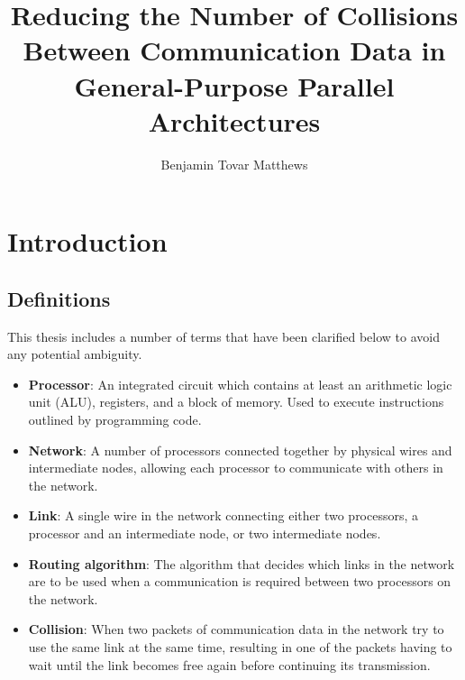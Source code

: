 \documentclass[a4paper, 12pt]{article}
\title{Reducing the Number of Collisions Between Communication Data in General-Purpose Parallel Architectures}
\author{Benjamin Tovar Matthews}
\begin{document}
\setcounter{page}{0}
\maketitle

\begin{abstract}

\end{abstract}

\thispagestyle{empty}
\newpage
{}
\setcounter{tocdepth}{2}
\tableofcontents
\newpage
\listoffigures

\newpage
\section{Introduction}

\subsection{Definitions}

This thesis includes a number of terms that have been clarified below to avoid any potential ambiguity.
\begin{itemize}[leftmargin=0cm]

\item[] \textbf{Processor}: An integrated circuit which contains at least an arithmetic logic unit (ALU), registers, and a block of memory. Used to execute instructions outlined by programming code.

\item[] \textbf{Network}: A number of processors connected together by physical wires and intermediate nodes, allowing each processor to communicate with others in the network.

\item[] \textbf{Link}: A single wire in the network connecting either two processors, a processor and an intermediate node, or two intermediate nodes.

\item[] \textbf{Routing algorithm}: The algorithm that decides which links in the network are to be used when a communication is required between two processors on the network.

\item[] \textbf{Collision}: When two packets of communication data in the network try to use the same link at the same time, resulting in one of the packets having to wait until the link becomes free again before continuing its transmission.

\end{itemize}
\end{document}
